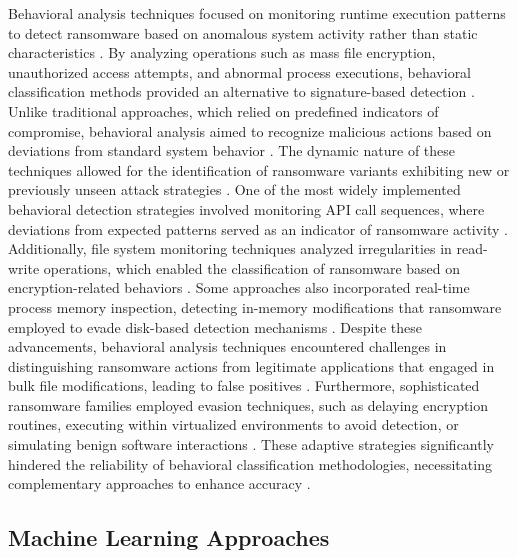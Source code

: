 \documentclass[lettersize,journal]{IEEEtran}
\begin{document}
Behavioral analysis techniques focused on monitoring runtime execution patterns to detect ransomware based on anomalous system activity rather than static characteristics \cite{moritaka2024enhanced}. By analyzing operations such as mass file encryption, unauthorized access attempts, and abnormal process executions, behavioral classification methods provided an alternative to signature-based detection \cite{pesem2024opcode}. Unlike traditional approaches, which relied on predefined indicators of compromise, behavioral analysis aimed to recognize malicious actions based on deviations from standard system behavior \cite{matae2024introducing}. The dynamic nature of these techniques allowed for the identification of ransomware variants exhibiting new or previously unseen attack strategies \cite{almeida2023analyzing}. One of the most widely implemented behavioral detection strategies involved monitoring API call sequences, where deviations from expected patterns served as an indicator of ransomware activity \cite{kosto2024automated}. Additionally, file system monitoring techniques analyzed irregularities in read-write operations, which enabled the classification of ransomware based on encryption-related behaviors \cite{welderman2024robust}. Some approaches also incorporated real-time process memory inspection, detecting in-memory modifications that ransomware employed to evade disk-based detection mechanisms \cite{mcintosh2024ransomware}. Despite these advancements, behavioral analysis techniques encountered challenges in distinguishing ransomware actions from legitimate applications that engaged in bulk file modifications, leading to false positives \cite{blowing2024performing}. Furthermore, sophisticated ransomware families employed evasion techniques, such as delaying encryption routines, executing within virtualized environments to avoid detection, or simulating benign software interactions \cite{blaas2024ransomware}. These adaptive strategies significantly hindered the reliability of behavioral classification methodologies, necessitating complementary approaches to enhance accuracy \cite{trit2024quantum}.

\subsection{Machine Learning Approaches}
\end{document}
